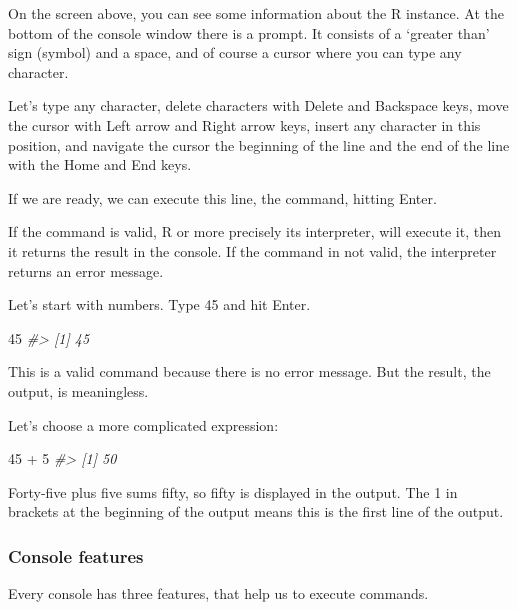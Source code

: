 \documentclass[
]{book}
\newenvironment{Shaded}{\begin{snugshade}}{\end{snugshade}}
\newcommand{\CommentTok}[1]{\textcolor[rgb]{0.56,0.35,0.01}{\textit{#1}}}
\newcommand{\DecValTok}[1]{\textcolor[rgb]{0.00,0.00,0.81}{#1}}
\newcommand{\SpecialCharTok}[1]{\textcolor[rgb]{0.00,0.00,0.00}{#1}}
\begin{document}
On the screen above, you can see some information about the R instance.
At the bottom of the console window there is a prompt. It consists of a
`greater than' sign (symbol) and a space, and of course a cursor where
you can type any character.

Let's type any character, delete characters with Delete and
Backspace keys, move the cursor with Left arrow
and Right arrow keys, insert any character in this position,
and navigate the cursor the beginning of the line and the end of the
line with the Home and End keys.

If we are ready, we can execute this line, the command, hitting
Enter.

If the command is valid, R or more precisely its interpreter, will
execute it, then it returns the result in the console. If the command in
not valid, the interpreter returns an error message.

Let's start with numbers. Type 45 and hit Enter.

\begin{Shaded}
\begin{Highlighting}[]
\DecValTok{45}
\CommentTok{\#\textgreater{} [1] 45}
\end{Highlighting}
\end{Shaded}

This is a valid command because there is no error message. But the
result, the output, is meaningless.

Let's choose a more complicated expression:

\begin{Shaded}
\begin{Highlighting}[]
\DecValTok{45} \SpecialCharTok{+} \DecValTok{5}
\CommentTok{\#\textgreater{} [1] 50}
\end{Highlighting}
\end{Shaded}

Forty-five plus five sums fifty, so fifty is displayed in the output.
The 1 in brackets at the beginning of the output means this is the first
line of the output.

\hypertarget{console-features}{%
\subsubsection{Console features}\label{console-features}}

Every console has three features, that help us to execute commands.
\end{document}
